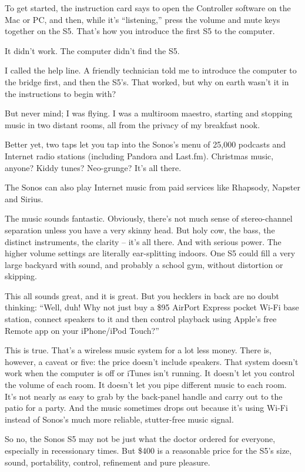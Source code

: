 ﻿\documentclass[12pt]{article}
\begin{document}
To get started, the instruction card says to open the Controller software on the Mac or PC, and
then, while it's ``listening,'' press the volume and mute keys together on the S5. That's how you
introduce the first S5 to the computer.

It didn't work. The computer didn't find the S5.

I called the help line. A friendly technician told me to introduce the computer to the bridge first,
and then the S5's. That worked, but why on earth wasn't it in the instructions to begin with?

But never mind; I was flying. I was a multiroom maestro, starting and stopping music in two distant
rooms, all from the privacy of my breakfast nook.

Better yet, two taps let you tap into the Sonos's menu of 25,000 podcasts and Internet radio
stations (including Pandora and Last.fm). Christmas music, anyone? Kiddy tunes? Neo-grunge? It's all
there.

The Sonos can also play Internet music from paid services like Rhapsody, Napster and Sirius.

The music sounds fantastic. Obviously, there's not much sense of stereo-channel separation unless
you have a very skinny head. But holy cow, the bass, the distinct instruments, the clarity -- it's
all there. And with serious power. The higher volume settings are literally ear-splitting indoors.
One S5 could fill a very large backyard with sound, and probably a school gym, without distortion or
skipping.

This all sounds great, and it is great. But you hecklers in back are no doubt thinking: ``Well, duh!
Why not just buy a \$95 AirPort Express pocket Wi-Fi base station, connect speakers to it and then
control playback using Apple's free Remote app on your iPhone/iPod Touch?''

This is true. That's a wireless music system for a lot less money. There is, however, a caveat or
five: the price doesn't include speakers. That system doesn't work when the computer is off or
iTunes isn't running. It doesn't let you control the volume of each room. It doesn't let you pipe
different music to each room. It's not nearly as easy to grab by the back-panel handle and carry out
to the patio for a party. And the music sometimes drops out because it's using Wi-Fi instead of
Sonos's much more reliable, stutter-free music signal.

So no, the Sonos S5 may not be just what the doctor ordered for everyone, especially in recessionary
times. But \$400 is a reasonable price for the S5's size, sound, portability, control, refinement
and pure pleasure.
\end{document}
